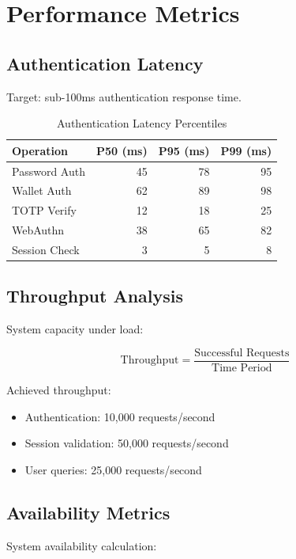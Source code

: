 \section{Performance Metrics}


\subsection{Authentication Latency}

Target: sub-100ms authentication response time.

\begin{table}[h]
\centering
\begin{tabular}{|l|r|r|r|}
\hline
\textbf{Operation} & \textbf{P50 (ms)} & \textbf{P95 (ms)} & \textbf{P99 (ms)} \\
\hline
Password Auth & 45 & 78 & 95 \\
Wallet Auth & 62 & 89 & 98 \\
TOTP Verify & 12 & 18 & 25 \\
WebAuthn & 38 & 65 & 82 \\
Session Check & 3 & 5 & 8 \\
\hline
\end{tabular}
\caption{Authentication Latency Percentiles}
\end{table}

\subsection{Throughput Analysis}

System capacity under load:

\begin{equation}
    \text{Throughput} = \frac{\text{Successful Requests}}{\text{Time Period}}
\end{equation}

Achieved throughput:
\begin{itemize}
    \item Authentication: 10,000 requests/second
    \item Session validation: 50,000 requests/second
    \item User queries: 25,000 requests/second
\end{itemize}

\subsection{Availability Metrics}

System availability calculation:

